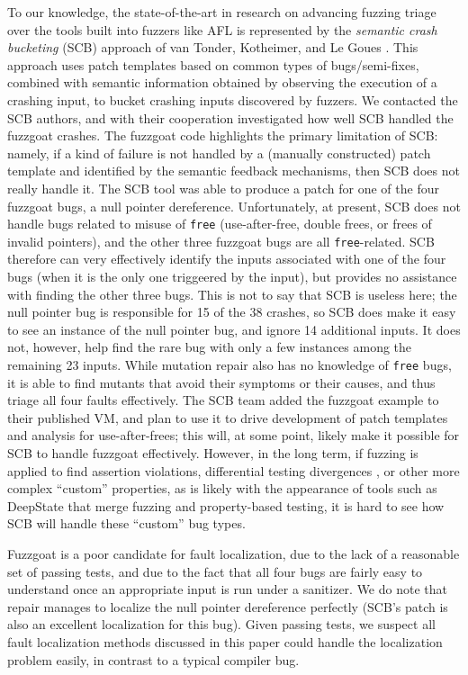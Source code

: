 To our knowledge, the state-of-the-art in research on advancing fuzzing triage over the tools built into fuzzers like AFL is represented by the \emph{semantic crash bucketing} (SCB) approach of van Tonder, Kotheimer, and Le Goues \cite{SCB}.  This approach uses patch templates based on common types of bugs/semi-fixes, combined with semantic information obtained by observing the execution of a crashing input, to bucket crashing inputs discovered by fuzzers.  We contacted the SCB authors, and with their cooperation investigated how well SCB handled the fuzzgoat crashes.  The fuzzgoat code highlights the primary limitation of SCB: namely, if a kind of failure is not handled by a (manually constructed) patch template and identified by the semantic feedback mechanisms, then SCB does not really handle it.  The SCB tool was able to produce a patch for one of the four fuzzgoat bugs, a null pointer dereference.  Unfortunately, at present, SCB does not handle bugs related to misuse of {\tt free} (use-after-free, double frees, or frees of invalid pointers), and the other three fuzzgoat bugs are all {\tt free}-related.  SCB therefore can very effectively identify the inputs associated with one of the four bugs (when it is the only one triggeered by the input), but provides no assistance with finding the other three bugs. This is not to say that SCB is useless here; the null pointer bug is responsible for 15 of the 38 crashes, so SCB does make it easy to see an instance of the null pointer bug, and ignore 14 additional inputs.  It does not, however, help find the rare bug with only a few instances among the remaining 23 inputs.  While mutation repair also has no knowledge of {\tt free} bugs, it is able to find mutants that avoid their symptoms or their causes, and thus triage all four faults effectively.   The SCB team added the fuzzgoat example to their published VM, and plan to use it to drive development of patch templates and analysis for use-after-frees; this will, at some point, likely make it possible for SCB to handle fuzzgoat effectively.  However, in the long term, if fuzzing is applied to find assertion violations, differential testing divergences \cite{Differential,ICSEDiff}, or other more complex ``custom'' properties, as is likely with the appearance of tools such as DeepState \cite{DeepState} that merge fuzzing and property-based testing, it is hard to see how SCB will handle these ``custom'' bug types.

Fuzzgoat is a poor candidate for fault localization, due to the lack of a reasonable set of passing tests, and due to the fact that all four bugs are fairly easy to understand once an appropriate input is run under a sanitizer.  We do note that repair manages to localize the null pointer dereference perfectly (SCB's patch is also an excellent localization for this bug).  Given passing tests, we suspect all fault localization methods discussed in this paper could handle the localization problem easily, in contrast to a typical compiler bug.

